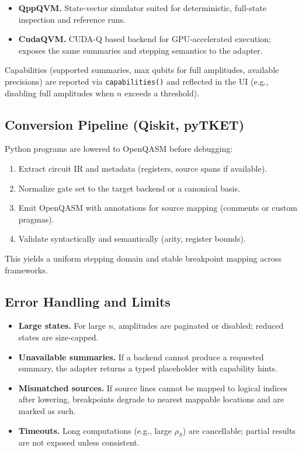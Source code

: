 \documentclass[12pt]{article}
\begin{document}
\begin{itemize}
  \item \textbf{QppQVM.} State-vector simulator suited for deterministic, full-state inspection and reference runs.
  \item \textbf{CudaQVM.} CUDA-Q based backend for GPU-accelerated execution; exposes the same summaries and stepping semantics to the adapter.
\end{itemize}

Capabilities (supported summaries, max qubits for full amplitudes, available precisions) are reported via \texttt{capabilities()} and reflected in the UI (e.g., disabling full amplitudes when \(n\) exceeds a threshold).

\subsection{Conversion Pipeline (Qiskit, pyTKET)}

Python programs are lowered to OpenQASM before debugging:

\begin{enumerate}
  \item Extract circuit IR and metadata (registers, source spans if available).
  \item Normalize gate set to the target backend or a canonical basis.
  \item Emit OpenQASM with annotations for source mapping (comments or custom pragmas).
  \item Validate syntactically and semantically (arity, register bounds).
\end{enumerate}

This yields a uniform stepping domain and stable breakpoint mapping across frameworks.

\subsection{Error Handling and Limits}

\begin{itemize}
  \item \textbf{Large states.} For large \(n\), amplitudes are paginated or disabled; reduced states are size-capped.
  \item \textbf{Unavailable summaries.} If a backend cannot produce a requested summary, the adapter returns a typed placeholder with capability hints.
  \item \textbf{Mismatched sources.} If source lines cannot be mapped to logical indices after lowering, breakpoints degrade to nearest mappable locations and are marked as such.
  \item \textbf{Timeouts.} Long computations (e.g., large \(\rho_S\)) are cancellable; partial results are not exposed unless consistent.
\end{itemize}
\end{document}
